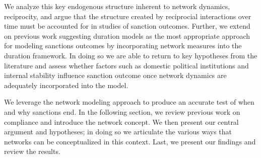 We analyze this key endogenous structure inherent to network dynamics, reciprocity, and argue that the structure created by reciprocial interactions over time must be accounted for in studies of sanction outcomes. Further, we extend on previous work suggesting duration models as the most appropriate approach for modeling sanctions outcomes by incorporating network measures into the duration framework. In doing so we are able to return to key hypotheses from the literature and assess whether factors such as domestic political institutions and internal stability influence sanction outcome once network dynamics are adequately incorporated into the model. 

We leverage the network modeling approach to produce an accurate test of when and why sanctions end. In the following section, we review previous work on compliance and introduce the network concept. We then present our central argument and hypotheses; in doing so we articulate the various ways that networks can be conceptualized in this context. Last, we present our findings and review the results.